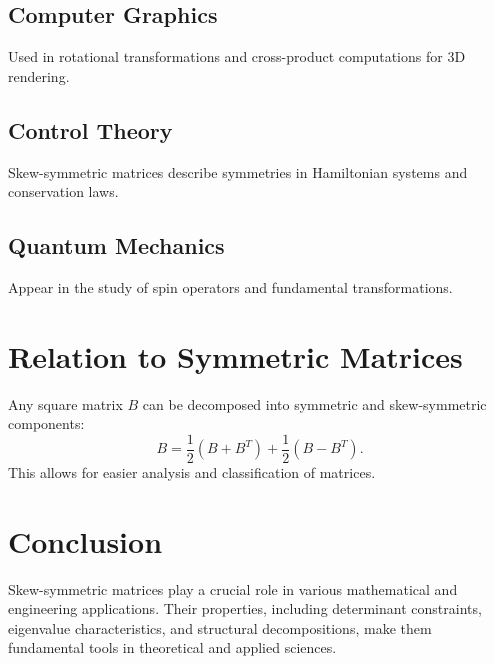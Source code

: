 \documentclass[a4paper,12pt]{article}
\begin{document}
	\subsection{Computer Graphics}
	Used in rotational transformations and cross-product computations for 3D rendering.
	
	\subsection{Control Theory}
	Skew-symmetric matrices describe symmetries in Hamiltonian systems and conservation laws.
	
	\subsection{Quantum Mechanics}
	Appear in the study of spin operators and fundamental transformations.
	
	\section{Relation to Symmetric Matrices}
	Any square matrix $B$ can be decomposed into symmetric and skew-symmetric components:
	\begin{equation}
		B = \frac{1}{2}(B + B^T) + \frac{1}{2}(B - B^T).
	\end{equation}
	This allows for easier analysis and classification of matrices.
	
	\section{Conclusion}
	Skew-symmetric matrices play a crucial role in various mathematical and engineering applications. Their properties, including determinant constraints, eigenvalue characteristics, and structural decompositions, make them fundamental tools in theoretical and applied sciences.
	
\end{document}
